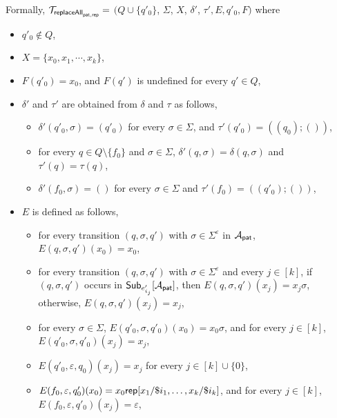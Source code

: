 Formally, $\mathcal{T}_{\mathsf{replaceAll}_{\mathsf{pat}, \mathsf{rep}}} =$ $(Q \cup \{q'_0\}$, $\Sigma$, $X$, $\delta'$, $\tau', E, q'_0, F)$ where
\begin{itemize}
\item $q'_0 \not \in Q$,

\item  $X = \{x_0, x_1, \cdots, x_k\}$,
%
\item $F(q'_0) = x_0$, and $F(q')$ is undefined for every $q' \in Q$,
%
\item $\delta'$ and $\tau'$ are obtained from $\delta$ and $\tau$ as follows,
\begin{itemize}
\item $\delta'(q'_0, \sigma) = (q'_0)$ for every $\sigma \in \Sigma$, and $\tau'(q'_0) = ((q_0); ())$,
%
\item for every $q \in Q \setminus \{f_0\}$ and $\sigma \in \Sigma$, $\delta'(q, \sigma) = \delta(q, \sigma)$ and $\tau'(q) = \tau(q)$, 
%
\item $\delta'(f_0, \sigma) = ()$ for every $\sigma \in \Sigma$ and $\tau'(f_0) = ((q'_0); ())$,
\end{itemize}
%
\item $E$ is defined as follows, 
\begin{itemize}
\item for every transition $(q, \sigma, q')$ with $\sigma \in \Sigma^\varepsilon$ in $\mathcal{A}_{\mathsf{pat}}$, $E(q, \sigma, q')(x_0) = x_0$,
%
\item for every transition $(q, \sigma, q')$ with $\sigma \in \Sigma^\varepsilon$ and every $j \in [k]$,  if $(q, \sigma, q')$ occurs in ${\sf Sub}_{e'_{i_j}}[\mathcal{A}_{\mathsf{pat}}]$, then $E(q, \sigma, q')(x_j) = x_j\sigma$, otherwise, $E(q, \sigma, q')(x_j) = x_j$,
%
%
\item  for every $\sigma \in \Sigma$, $E(q'_0, \sigma, q'_0)(x_0) = x_0\sigma$, and for every $j \in [k]$, $E(q'_0, \sigma, q'_0)(x_j) = x_j$, 

\item $E(q'_0, \varepsilon, q_0)(x_j) = x_j$ for every $j \in [k] \cup \{0\}$, 
%
\item $E(f_0, \varepsilon, q'_0)(x_0) = x_0 \mathsf{rep}[x_1/\$i_1,\ldots, x_k/\$i_k]$, and for every $j \in [k]$, $E(f_0, \varepsilon, q'_0)(x_j) = \varepsilon$, 

\end{itemize}
%
\end{itemize}

